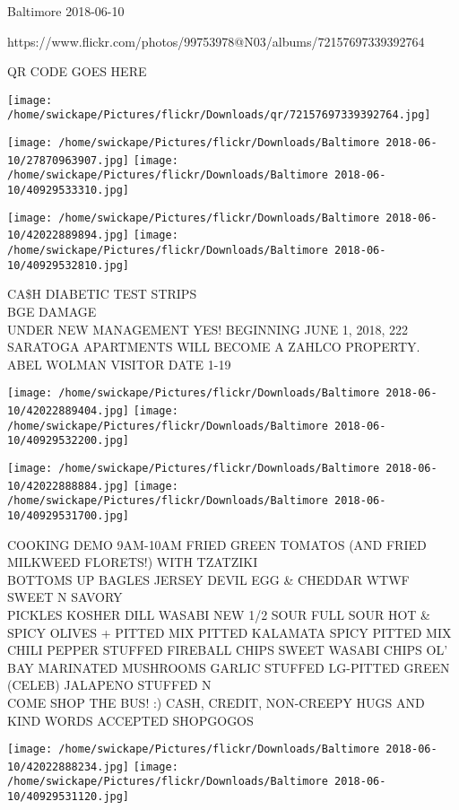 \documentclass[10pt,letterpaper]{article}
\begin{document}
Baltimore 2018-06-10

https://www.flickr.com/photos/99753978@N03/albums/72157697339392764

QR CODE GOES HERE

\texttt{[image: /home/swickape/Pictures/flickr/Downloads/qr/72157697339392764.jpg]}
\pagebreak

\texttt{[image: /home/swickape/Pictures/flickr/Downloads/Baltimore 2018-06-10/27870963907.jpg]}
\texttt{[image: /home/swickape/Pictures/flickr/Downloads/Baltimore 2018-06-10/40929533310.jpg]}

\texttt{[image: /home/swickape/Pictures/flickr/Downloads/Baltimore 2018-06-10/42022889894.jpg]}
\texttt{[image: /home/swickape/Pictures/flickr/Downloads/Baltimore 2018-06-10/40929532810.jpg]}

CA\$H DIABETIC TEST STRIPS\\
BGE DAMAGE\\
UNDER NEW MANAGEMENT YES!  BEGINNING JUNE 1, 2018, 222 SARATOGA APARTMENTS WILL BECOME A ZAHLCO PROPERTY.\\
ABEL WOLMAN VISITOR DATE 1{-}19\\
\pagebreak

\texttt{[image: /home/swickape/Pictures/flickr/Downloads/Baltimore 2018-06-10/42022889404.jpg]}
\texttt{[image: /home/swickape/Pictures/flickr/Downloads/Baltimore 2018-06-10/40929532200.jpg]}

\texttt{[image: /home/swickape/Pictures/flickr/Downloads/Baltimore 2018-06-10/42022888884.jpg]}
\texttt{[image: /home/swickape/Pictures/flickr/Downloads/Baltimore 2018-06-10/40929531700.jpg]}

COOKING DEMO 9AM{-}10AM FRIED GREEN TOMATOS (AND FRIED MILKWEED FLORETS!) WITH TZATZIKI\\
BOTTOMS UP BAGLES JERSEY DEVIL EGG \& CHEDDAR WTWF SWEET N SAVORY\\
PICKLES KOSHER DILL WASABI NEW 1/2 SOUR FULL SOUR HOT \& SPICY OLIVES + PITTED MIX PITTED KALAMATA SPICY PITTED MIX CHILI PEPPER STUFFED FIREBALL CHIPS SWEET WASABI CHIPS OL' BAY MARINATED MUSHROOMS GARLIC STUFFED LG{-}PITTED GREEN (CELEB) JALAPENO STUFFED N\\
COME SHOP THE BUS!  :) CASH, CREDIT, NON{-}CREEPY HUGS AND KIND WORDS ACCEPTED SHOPGOGOS\\
\pagebreak

\texttt{[image: /home/swickape/Pictures/flickr/Downloads/Baltimore 2018-06-10/42022888234.jpg]}
\texttt{[image: /home/swickape/Pictures/flickr/Downloads/Baltimore 2018-06-10/40929531120.jpg]}
\end{document}

